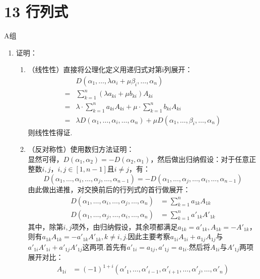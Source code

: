 \section*{13 行列式}

\vspace{2ex}

\centerline{\heiti A组}
\begin{enumerate}
    \item 证明：\begin{enumerate}
        \item （线性性）直接将公理化定义用递归式对第i列展开：
        \begin{align*}
            & D(\alpha_1,\ldots,\lambda\alpha_{i}+\mu\beta_i,\ldots,\alpha_n)\\
            ={}& \sum_{k=1}^{n}(\lambda a_{ki}+\mu b_{ki})A_{ki}\\
            ={}& \lambda \cdot \sum_{k=1}^{n}a_{ki}A_{ki}+\mu \cdot \sum_{k=1}^{n}b_{ki}A_{ki}\\
            ={}& \lambda D(\alpha_1,\ldots,\alpha_{i},\ldots,\alpha_n)+\mu D(\alpha_1,\ldots,\beta_i,\ldots,\alpha_n)
        \end{align*}
        则线性性得证.
        \item （反对称性）使用数归方法证明：\\显然可得，$D(\alpha_1,\alpha_2)=-D(\alpha_2,\alpha_1)$，然后做出归纳假设：对于任意正整数$i,j$，$i,j \in [1,n-1]$且$i \neq j$，有：
        \[ D(\alpha_1,\ldots,\alpha_i,\ldots,\alpha_j,\ldots,\alpha_{n-1})=-D(\alpha_1,\ldots,\alpha_j,\ldots,\alpha_i,\ldots,\alpha_{n-1}) \]
        由此做出递推，对交换前后的行列式的首行做展开：
        \begin{align*}
            D(\alpha_1,\ldots,\alpha_{i},\ldots,\alpha_{j},\ldots,\alpha_n)
            & =\sum_{k=1}^{n}a_{1k}A_{1k}\\
            D(\alpha_1,\ldots,\alpha_{j},\ldots,\alpha_{i},\ldots,\alpha_n)
            & =\sum_{k=1}^{n}a'_{1k}A'_{1k}
        \end{align*}
        其中，除第$i,j$项外，由归纳假设，其余项都满足$a_{1k}=a'_{1k},A_{1k}=-A'_{1k}$，则有$a_{1k}A_{1k}=-a'_{1k}A'_{1k},k\neq i,j$.因此主要考察$a_{1i}A_{1i}+a_{1j}A_{1j}$与$a'_{1i}A'_{1i}+a'_{1j}A'_{1j}$这两项.首先有$a'_{1i}=a_{1j},a'_{1j}=a_{1i}$.然后将$A_{1i}$与$A'_{1j}$两项展开对比：
        \begin{align*}
            A_{1i}&=(-1)^{1+i}(\alpha'_{1},\ldots,\alpha'_{i-1},\alpha'_{i+1},\ldots,\alpha'_{j},\ldots,\alpha'_{n})\\

\end{align*}
\end{enumerate}
\end{enumerate}
